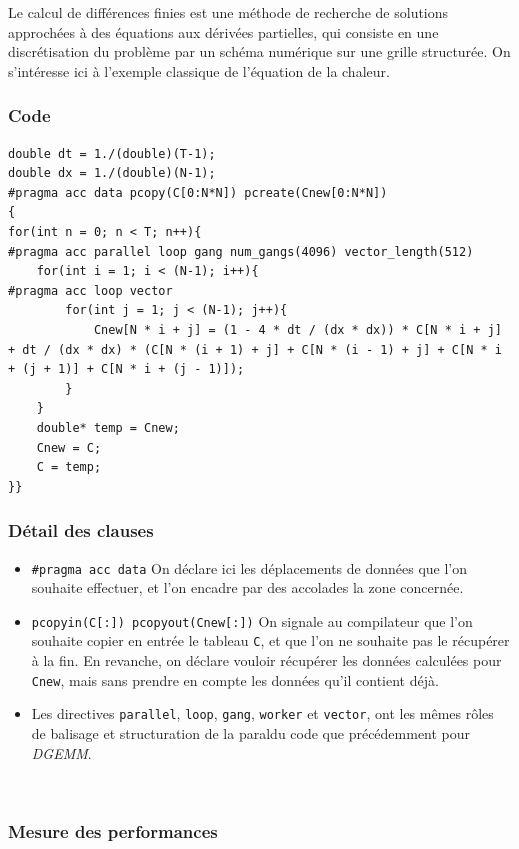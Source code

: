 \documentclass{article}
\begin{document}
Le calcul de différences finies est une méthode de recherche de solutions approchées à des équations aux dérivées partielles, qui consiste en une discrétisation du problème par un schéma numérique sur une grille structurée. On s'intéresse ici à l'exemple classique de l'équation de la chaleur.

\subsubsection{Code}

\begin{lstlisting}[caption={Implémentation des différences finies}]
double dt = 1./(double)(T-1);
double dx = 1./(double)(N-1);
#pragma acc data pcopy(C[0:N*N]) pcreate(Cnew[0:N*N])
{
for(int n = 0; n < T; n++){
#pragma acc parallel loop gang num_gangs(4096) vector_length(512)
	for(int i = 1; i < (N-1); i++){
#pragma acc loop vector
		for(int j = 1; j < (N-1); j++){
			Cnew[N * i + j] = (1 - 4 * dt / (dx * dx)) * C[N * i + j] + dt / (dx * dx) * (C[N * (i + 1) + j] + C[N * (i - 1) + j] + C[N * i + (j + 1)] + C[N * i + (j - 1)]);
		}
	}
	double* temp = Cnew;
	Cnew = C;
	C = temp;
}}
\end{lstlisting}

\subsubsection{Détail des clauses}

\begin{itemize}
	\item \texttt{\#pragma acc data} On déclare ici les déplacements de données que l'on souhaite effectuer, et l'on encadre par des accolades la zone concernée.
	\item \texttt{pcopyin(C[:]) pcopyout(Cnew[:])} On signale au compilateur que l'on souhaite copier en entrée le tableau \texttt{C}, et que l'on ne souhaite pas le récupérer à la fin. En revanche, on déclare vouloir récupérer les données calculées pour \texttt{Cnew}, mais sans prendre en compte les données qu'il contient déjà.
	\item Les directives \texttt{parallel}, \texttt{loop}, \texttt{gang}, \texttt{worker} et \texttt{vector}, ont les mêmes rôles de balisage et structuration de la \gls{paral}du code que précédemment  pour \textit{DGEMM}.
\end{itemize}

~\\

\subsubsection{Mesure des performances}
\end{document}
